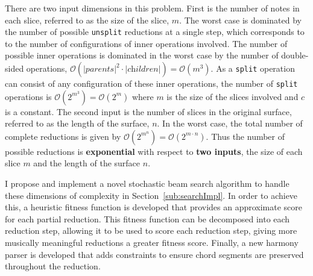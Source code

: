 \documentclass[12pt,a4paper,twoside,openany]{report} \usepackage[pdfborder={0 0 0}]{hyperref}    %
\theoremstyle{definition} \newtheorem{definition}{Definition}[section]
\begin{document}
There are two input dimensions in this problem. 
First is the number of notes in each slice, referred to as the size of the slice, $m$.  
The worst case is dominated by the number of possible \texttt{unsplit} reductions at a single step, which corresponds to to the number of configurations of inner operations involved. 
The number of possible inner operations is dominated in the worst case by the number of double-sided operations, $\mathcal{O}(|\textit{parents}|^2 \cdot |\textit{children}|) = \mathcal{O}(m^3)$. 
    As a \texttt{split} operation can consist of any configuration of these inner operations, the number of \texttt{split} operations is $\mathcal{O}(2^{m^3})
    = \mathcal{O}(2^m)$ where $m$ is the size of the slices involved and $c$ is a constant.
    The second input is the number of slices in the original surface, referred to as the length of the surface, $n$.
    In the worst case, the total number of complete reductions is given by $\mathcal{O}(2^{m^{n}})
    = \mathcal{O}(2^{m \cdot n})$. 
    Thus the number of possible reductions is \textbf{exponential} with respect to \textbf{two inputs}, the size of each slice $m$ and the length of the surface $n$. 

I propose and implement a novel stochastic beam search algorithm to handle these dimensions of complexity in
Section~\ref{sub:searchImpl}. In order to achieve this, a heuristic fitness function is developed that provides an approximate
score for each partial reduction. This fitness function can be decomposed into each reduction step, allowing it to be
used to score each reduction step, giving more musically meaningful reductions a greater fitness score. 
Finally, a new harmony parser is developed that adds constraints to ensure chord segments are preserved throughout the reduction.
 
\end{document}
